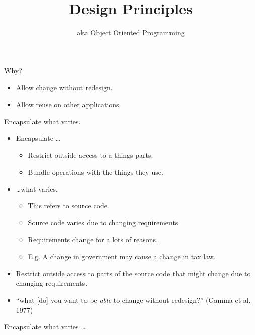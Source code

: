 \documentclass{beamer}
\title{Design Principles}
\subtitle{aka Object Oriented Programming}
\begin{document}
\begin{frame}
  \titlepage
\end{frame}

\begin{frame}{Why?}

    \begin{itemize}
        \item Allow change without redesign.
        \item Allow reuse on other applications.
    \end{itemize}

\end{frame}

\begin{frame}{Encapsulate what varies.}
    \begin{itemize}
        \item Encapsulate \ldots
            \begin{itemize}
                \item Restrict outside access to a things parts.
                \item Bundle operations with the things they use.
            \end{itemize}
        \item \ldots what varies.
            \begin{itemize}
                \item This refers to source code.
                \item Source code varies due to changing requirements.
                \item Requirements change for a lots of reasons.
                \item E.g. A change in government may cause a change in tax law.
            \end{itemize}
        \item Restrict outside access to parts of the source code that might change due to changing requirements.
        \item ``what [do] you want to be \textit{able} to change without redesign?'' (Gamma et al, 1977)
    \end{itemize}
\end{frame}

\begin{frame}{Encapsulate what varies \ldots}
    \begin{columns}
        \column{\dimexpr\paperwidth-40pt}
        
    \end{columns}
\end{frame}
\end{document}
